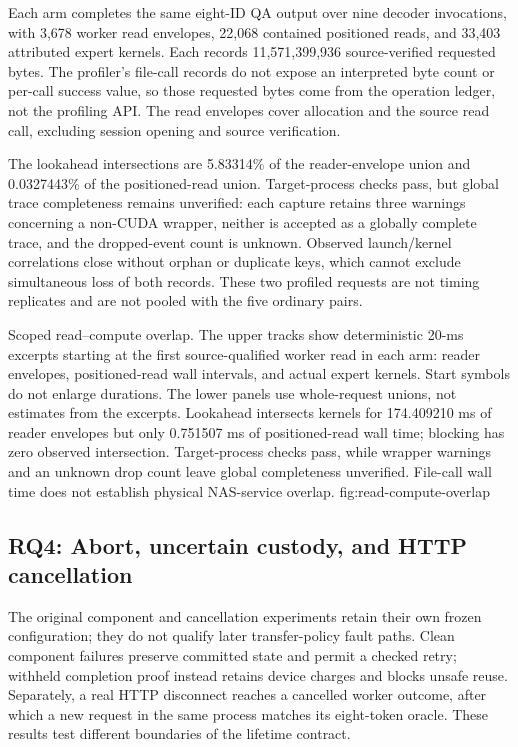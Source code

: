 Each arm completes the same eight-ID QA output over nine decoder invocations,
with 3,678 worker read envelopes, 22,068 contained positioned reads, and
33,403 attributed expert kernels. Each records 11,571,399,936 source-verified
requested bytes. The profiler's file-call records do not expose an interpreted
byte count or per-call success value, so those requested bytes come from the
operation ledger, not the profiling API. The read envelopes cover allocation
and the source read call, excluding session opening and source verification.

The lookahead intersections are 5.83314\% of the reader-envelope union and
0.0327443\% of the positioned-read union. Target-process checks pass, but
global trace completeness remains unverified: each capture retains three
warnings concerning a non-CUDA wrapper, neither is accepted as a globally
complete trace, and the dropped-event count is unknown. Observed launch/kernel
correlations close without orphan or duplicate keys, which cannot exclude
simultaneous loss of both records. These two profiled requests are not timing
replicates and are not pooled with the five ordinary pairs.

{Scoped read--compute overlap. The upper tracks show deterministic 20-ms
excerpts starting at the first source-qualified worker read in each arm:
reader envelopes, positioned-read wall intervals, and actual expert kernels.
Start symbols do not enlarge durations. The lower panels use whole-request
unions, not estimates from the excerpts. Lookahead intersects kernels for
174.409210 ms of reader envelopes but only 0.751507 ms of positioned-read wall
time; blocking has zero observed intersection. Target-process checks pass,
while wrapper warnings and an unknown drop count leave global completeness
unverified. File-call wall time does not establish physical NAS-service overlap.}
{fig:read-compute-overlap}

\subsection{RQ4: Abort, uncertain custody, and HTTP cancellation}
\label{sec:rq4}
The original component and cancellation experiments retain their own frozen
configuration; they do not qualify later transfer-policy fault paths.
Clean component failures preserve committed state and permit a checked retry;
withheld completion proof instead retains device charges and blocks unsafe
reuse. Separately, a real HTTP disconnect reaches a cancelled worker outcome,
after which a new request in the same process matches its eight-token oracle.
These results test different boundaries of the lifetime contract.

